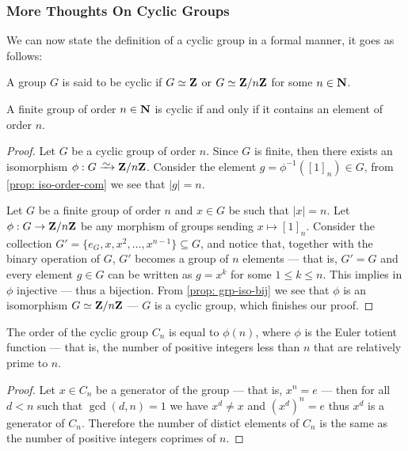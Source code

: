 \subsubsection{More Thoughts On Cyclic Groups}

We can now state the definition of a cyclic group in a formal manner, it goes as
follows:

\begin{definition}\label{def: cyclic-grp}
  A group \(G\) is said to be cyclic if \(G \simeq \mathbf{Z}\) or \(G \simeq \mathbf{Z}/n\mathbf{Z}\) for
  some \(n \in \mathbf{N}\).
\end{definition}

\begin{proposition}
  A finite group of order \(n \in \mathbf{N}\) is cyclic if and only if it contains an
  element of order \(n\).
\end{proposition}

\begin{proof}
  Let \(G\) be a cyclic group of order \(n\). Since \(G\) is finite, then there
  exists an isomorphism \(\phi: G \isoto \Z/n\Z\). Consider the element \(g =
  \phi^{-1}({[1]}_n) \in G\), from \cref{prop: iso-order-com} we see that \(|g| =
  n\).

  Let \(G\) be a finite group of order \(n\) and \(x \in G\) be such that \(|x|
  = n\). Let \(\phi: G \to \mathbf{Z}/n\mathbf{Z}\) be any morphism of groups sending \(x
  \mapsto {[1]}_n\). Consider the collection \(G' = \{e_G, x, x^2, \dots,
  x^{n-1}\} \subseteq G\), and notice that, together with the binary operation
  of \(G\), \(G'\) becomes a group of \(n\) elements --- that is, \(G' = G\) and
  every element \(g \in G\) can be written as \(g = x^k\) for some \(1 \leq k
  \leq n\). This implies in \(\phi\) injective --- thus a bijection. From
  \cref{prop: grp-iso-bij} we see that \(\phi\) is an isomorphism \(G \simeq
  \mathbf{Z}/n\mathbf{Z}\) --- \(G\) is a cyclic group, which finishes our proof.
\end{proof}

\begin{proposition}
  \label{prop:order-cyclic-totient}
  The order of the cyclic group \(C_n\) is equal to \(\phi(n)\), where \(\phi\) is the
  Euler totient function --- that is, the number of positive integers less than
  \(n\) that are relatively prime to \(n\).
\end{proposition}

\begin{proof}
  Let \(x \in C_n\) be a generator of the group --- that is, \(x^n = e\) --- then
  for all \(d < n\) such that \(\gcd(d, n) = 1\) we have \(x^d \neq x\) and
  \((x^d)^n = e\) thus \(x^d\) is a generator of \(C_n\). Therefore the number
  of distict elements of \(C_n\) is the same as the number of positive integers
  coprimes of \(n\).
\end{proof}

